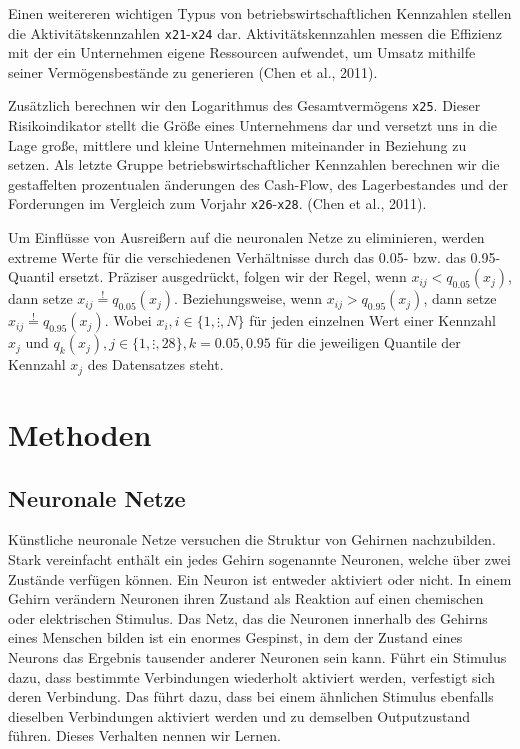 \documentclass{article}
\begin{document}
Einen weitereren wichtigen Typus von betriebswirtschaftlichen Kennzahlen stellen die Aktivit{\"a}tskennzahlen \texttt{x21}-\texttt{x24} dar. Aktivit{\"a}tskennzahlen messen die Effizienz mit der ein Unternehmen eigene Ressourcen aufwendet, um Umsatz mithilfe seiner Verm{\"o}gensbest{\"a}nde zu generieren (Chen et al., 2011).

Zus{\"a}tzlich berechnen wir den Logarithmus des Gesamtverm{\"o}gens \texttt{x25}. Dieser Risikoindikator stellt die Gr{\"o}{\ss}e eines Unternehmens dar und versetzt uns in die Lage gro{\ss}e, mittlere und kleine Unternehmen miteinander in Beziehung zu setzen. Als letzte Gruppe betriebswirtschaftlicher Kennzahlen berechnen wir die gestaffelten prozentualen {\"a}nderungen des Cash-Flow, des Lagerbestandes und der Forderungen im Vergleich zum Vorjahr \texttt{x26}-\texttt{x28}. (Chen et al., 2011).

Um Einfl{\"u}sse von Ausrei{\ss}ern auf die neuronalen Netze zu eliminieren, werden extreme Werte f{\"u}r die verschiedenen Verh{\"a}ltnisse durch das 0.05- bzw. das 0.95-Quantil ersetzt. Pr{\"a}ziser ausgedr{\"u}ckt, folgen wir der Regel, wenn $x_{ij} < q_{0.05}(x_j)$, dann setze $x_{ij} \stackrel{!}{=} q_{0.05}(x_j)$. Beziehungsweise, wenn $x_{ij} > q_{0.95}(x_j)$, dann setze $x_{ij} \stackrel{!}{=} q_{0.95}(x_j)$. Wobei $x_i, i \in \{1, \vdots, N\}$ f{\"u}r jeden einzelnen Wert einer Kennzahl $x_j$ und $q_k(x_j), j \in \{1, \vdots, 28\}, k=0.05, 0.95$ f{\"u}r die jeweiligen Quantile der Kennzahl $x_j$ des Datensatzes steht.

\section{Methoden}
\subsection{Neuronale Netze}

K{\"u}nstliche neuronale Netze versuchen die Struktur von Gehirnen nachzubilden. Stark vereinfacht enth{\"a}lt ein jedes Gehirn sogenannte Neuronen, welche {\"u}ber zwei Zust{\"a}nde verf{\"u}gen k{\"o}nnen. Ein Neuron ist entweder aktiviert oder nicht. In einem Gehirn ver{\"a}ndern Neuronen ihren Zustand als Reaktion auf einen chemischen oder elektrischen Stimulus. Das Netz, das die Neuronen innerhalb des Gehirns eines Menschen bilden ist ein enormes Gespinst, in dem der Zustand eines Neurons das Ergebnis tausender anderer Neuronen sein kann. F{\"u}hrt ein Stimulus dazu, dass bestimmte Verbindungen wiederholt aktiviert werden, verfestigt sich deren Verbindung. Das f{\"u}hrt dazu, dass bei einem {\"a}hnlichen Stimulus ebenfalls dieselben Verbindungen aktiviert werden und zu demselben Outputzustand f{\"u}hren. Dieses Verhalten nennen wir Lernen.
\end{document}
